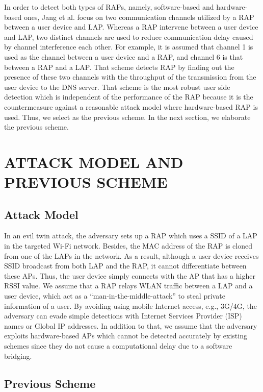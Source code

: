 \documentclass[conference]{IEEEtran}
\begin{document}
In order to detect both types of RAPs, namely, software-based and hardware-based ones, Jang et al. focus on two communication channels utilized by a RAP between a user device and LAP\cite{previous}.
Whereas a RAP intervene between a user device and LAP, two distinct channels are used to reduce communication delay caused by channel interference each other.
For example, it is assumed that channel 1 is used as the channel between a user device and a RAP, and channel 6 is that between a RAP and a LAP.
That scheme detects RAP by finding out the presence of these two channels with the throughput of the transmission from the user device to the DNS server.
That scheme is the most robust user side detection which is independent of the performance of the RAP because it is the countermeasure against a reasonable attack model where hardware-based RAP is used.
Thus, we select \cite{previous} as the previous scheme.
In the next section, we elaborate the previous scheme.

\section{ATTACK MODEL AND PREVIOUS SCHEME}\label{sec:3}
\subsection{Attack Model}
In an evil twin attack, the adversary sets up a RAP which uses a SSID of a LAP in the targeted Wi-Fi network.
Besides, the MAC address of the RAP is cloned from one of the LAPs in the network.
As a result, although a user device receives SSID broadcast from both LAP and the RAP, it cannot differentiate between these APs.
Thus, the user device simply connects with the AP that has a higher RSSI value.
We assume that a RAP relays WLAN traffic between a LAP and a user device, which act as a ``man-in-the-middle-attack'' to steal private information of a user.
By avoiding using mobile Internet access, e.g., 3G/4G, the adversary can evade simple detections with Internet Services Provider (ISP) names or Global IP addresses\cite{rtt}.
In addition to that, we assume that the adversary exploits hardware-based APs which cannot be detected accurately by existing schemes since they do not cause a computational delay due to a software bridging.

\subsection{Previous Scheme}
\end{document}
